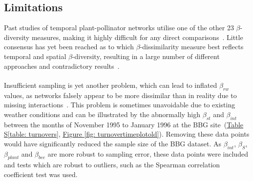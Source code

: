 \documentclass[11pt]{article}
\begin{document}
\subsection{Limitations}

Past studies of temporal plant-pollinator networks utilise one of the other 23 $\beta$-diversity measures, making it highly difficult for any direct comparisons~\citep{BASILIO2006, Alarcon2008, Olesen2008, Burkle2013}. Little consensus has yet been reached as to which $\beta$-dissimilarity measure best reflects temporal and spatial $\beta$-diversity, resulting in a large number of different approaches and contradictory results~\citep{Koleff2003, Poisot2015}.\\
\\
Insufficient sampling is yet another problem, which can lead to inflated $\beta_{rw}$ values, as networks falsely appear to be more dissimilar than in reality due to missing interactions~\citep{Vazquez2007, Dormann2009, Poisot2012a}. This problem is sometimes unavoidable due to existing weather conditions and can be illustrated by the abnormally high $\beta_{st}$ and $\beta_{int}$ between the months of November 1995 to January 1996 at the BBG site~(\hyperref[table: turnovers]{Table S\ref{table: turnovers}}, \hyperref[fig: turnovertimeplotold]{Figure \ref{fig: turnovertimeplotold}}). Removing these data points would have significantly reduced the sample size of the BBG dataset. As $\beta_{int}$, $\beta_{S}$, $\beta_{plant}$ and $\beta_{bee}$ are more robust to sampling error, these data points were included and tests which are robust to outliers, such as the Spearman correlation coefficient test was used.
\end{document}

